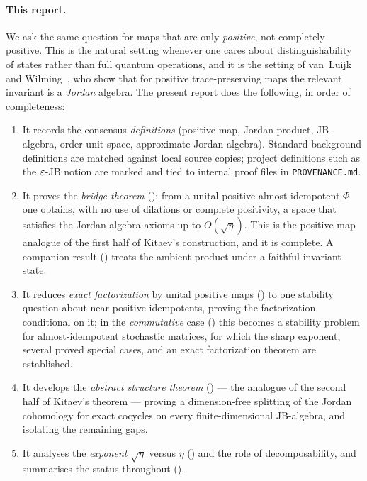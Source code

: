 \paragraph{This report.}
We ask the same question for maps that are only \emph{positive}, not completely
positive. This is the natural setting whenever one cares about distinguishability
of states rather than full quantum operations, and it is the setting of
van~Luijk and Wilming~\cite{vanLuijkWilming2026}, who show that for positive
trace-preserving maps the relevant invariant is a \emph{Jordan} algebra. The
present report does the following, in order of completeness:
\begin{enumerate}[leftmargin=*]
  \item It records the consensus \emph{definitions} (positive map, Jordan
    product, JB-algebra, order-unit space, approximate Jordan algebra). Standard
    background definitions are matched against local source copies; project
    definitions such as the $\varepsilon$-JB notion are marked  and
    tied to internal proof files in \texttt{PROVENANCE.md}.
  \item It proves the \emph{bridge theorem} (): from a unital
    positive almost-idempotent $\Phi$ one obtains, with no use of dilations or
    complete positivity, a space that satisfies the Jordan-algebra axioms up to
    $O(\sqrt\eta)$. This is the positive-map analogue of the first half of
    Kitaev's construction, and it is complete. A companion result
    () treats the ambient product under a faithful invariant
    state.
  \item It reduces \emph{exact factorization} by unital positive maps
    () to one stability question about near-positive
    idempotents, proving the factorization conditional on it; in the
    \emph{commutative} case () this becomes a stability
    problem for almost-idempotent stochastic matrices, for which the sharp
    exponent, several proved special cases, and an exact factorization theorem
    are established.
  \item It develops the \emph{abstract structure theorem}
    () --- the analogue of the second half of Kitaev's
    theorem --- proving a dimension-free splitting of the Jordan cohomology for
    exact cocycles on every finite-dimensional JB-algebra, and isolating the
    remaining gaps.
  \item It analyses the \emph{exponent} $\sqrt\eta$ versus $\eta$
    () and the role of decomposability, and summarises the
    status throughout ().
\end{enumerate}


